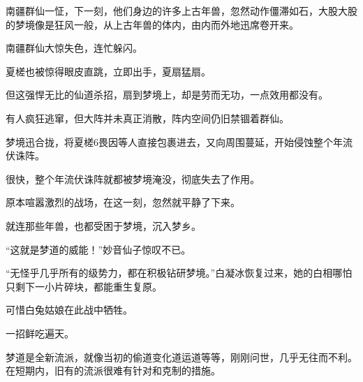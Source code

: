 \begin{this_body}
南疆群仙一怔，下一刻，他们身边的许多上古年兽，忽然动作僵滞如石，大股大股的梦境像是狂风一般，从上古年兽的体内，由内而外地迅席卷开来。

南疆群仙大惊失色，连忙躲闪。

夏槎也被惊得眼皮直跳，立即出手，夏扇猛扇。

但这强悍无比的仙道杀招，扇到梦境上，却是劳而无功，一点效用都没有。

有人疯狂逃窜，但大阵并未真正消散，阵内空间仍旧禁锢着群仙。

梦境迅合拢，将夏槎6畏因等人直接包裹进去，又向周围蔓延，开始侵蚀整个年流伏诛阵。

很快，整个年流伏诛阵就都被梦境淹没，彻底失去了作用。

原本喧嚣激烈的战场，在这一刻，忽然就平静了下来。

就连那些年兽，也都受困于梦境，沉入梦乡。

“这就是梦道的威能！”妙音仙子惊叹不已。

“无怪乎几乎所有的级势力，都在积极钻研梦境。”白凝冰恢复过来，她的白相哪怕只剩下一小片碎块，都能重生复原。

可惜白兔姑娘在此战中牺牲。

一招鲜吃遍天。

梦道是全新流派，就像当初的偷道变化道运道等等，刚刚问世，几乎无往而不利。在短期内，旧有的流派很难有针对和克制的措施。

\end{this_body}

